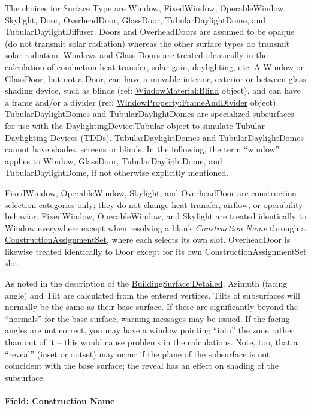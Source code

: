 The choices for Surface Type are Window, FixedWindow, OperableWindow, Skylight, Door, OverheadDoor, GlassDoor, TubularDaylightDome, and TubularDaylightDiffuser. Doors and OverheadDoors are assumed to be opaque (do not transmit solar radiation) whereas the other surface types do transmit solar radiation. Windows and Glass Doors are treated identically in the calculation of conduction heat transfer, solar gain, daylighting, etc. A Window or GlassDoor, but not a Door, can have a movable interior, exterior or between-glass shading device, such as blinds (ref: \hyperref[windowmaterialblind]{WindowMaterial:Blind} object), and can have a frame and/or a divider (ref: \hyperref[windowpropertyframeanddivider]{WindowProperty:FrameAndDivider} object). TubularDaylightDomes and TubularDaylightDomes are specialized subsurfaces for use with the \hyperref[daylightingdevicetubular]{DaylightingDevice:Tubular} object to simulate Tubular Daylighting Devices (TDDs). TubularDaylightDomes and TubularDaylightDomes cannot have shades, screens or blinds. In the following, the term ``window'' applies to Window, GlassDoor, TubularDaylightDome, and TubularDaylightDome, if not otherwise explicitly mentioned.

FixedWindow, OperableWindow, Skylight, and OverheadDoor are construction-selection categories only; they do not change heat transfer, airflow, or operability behavior. FixedWindow, OperableWindow, and Skylight are treated identically to Window everywhere except when resolving a blank \emph{Construction Name} through a \hyperref[constructionassignmentset]{ConstructionAssignmentSet}, where each selects its own slot. OverheadDoor is likewise treated identically to Door except for its own ConstructionAssignmentSet slot.

As noted in the description of the \hyperref[buildingsurfacedetailed]{BuildingSurface:Detailed}, Azimuth (facing angle) and Tilt are calculated from the entered vertices. Tilts of subsurfaces will normally be the same as their base surface. If these are significantly beyond the ``normals'' for the base surface, warning messages may be issued. If the facing angles are not correct, you may have a window pointing ``into'' the zone rather than out of it -- this would cause problems in the calculations. Note, too, that a ``reveal'' (inset or outset) may occur if the plane of the subsurface is not coincident with the base surface; the reveal has an effect on shading of the subsurface.

\paragraph{Field: Construction Name}\label{field-construction-name-20}

